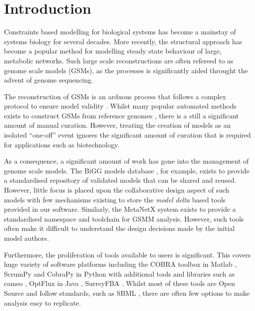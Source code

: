 \documentclass{bioinfo}
\begin{document}
\maketitle

\section{Introduction}
Constraints based modelling for biological systems has become a mainstay of systems biology for several decades.
More recently, the structural approach has become a popular method for modelling steady state behaviour of large, metabolic networks.
Such large scale reconstructions are often refereed to as genome scale models (GSMs), as the processes is significantly aided throught the advent of genome sequencing.

The reconstruction of GSMs is an arduous process that follows a complex protocol to ensure model validity \cite{thiele2010protocol}.
Whilst many popular automated methods exists to construct GSMs from reference genomes \cite{henry2010high, ScrumPy}, there is a still a significant amount of manual curation.
However, treating the creation of models as an isolated ``one-off'' event ignores the significant amount of curation that is required for applications such as biotechnology.

As a consequence, a significant amount of work has gone into the management of genome scale models.
The BiGG models database \cite{king2015bigg}, for example, exists to provide a standardised repository of validated models that can be shared and reused.
However, little focus is placed upon the collaborative design aspect of such models with few mechanisms existing to store the \textit{model delta} based tools provided in our software.
Similarly, the MetaNetX \cite{moretti2016metanetx} system exists to provide a standardised namespace and toolchain for GSMM analysis.
However, such tools often make it difficult to understand the design decisions made by the initial model authors.

Furthermore, the proliferation of tools available to users is significant.
This covers huge variety of software platforms including the COBRA toolbox in Matlab \cite{schellenberger2011quantitative},
ScrumPy and CobraPy in Python \cite{ScrumPy, ebrahim2013cobrapy} with additional tools and libraries such as cameo \cite{cardoso2017cameo}, OptFlux in Java \cite{rocha2010optflux}, SurreyFBA \cite{gevorgyan2010surreyfba}.
Whilst most of these tools are Open Source and follow standards, such as SBML \cite{finney2003systems}, there are often few options to make analysis easy to replicate.
\end{document}
